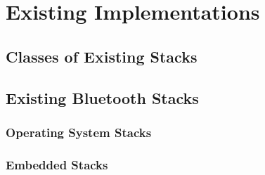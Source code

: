 \chapter{Existing Implementations}
\label{Chapter 2}


\section{Classes of Existing Stacks}


\section{Existing Bluetooth Stacks}


\subsection{Operating System Stacks}


\subsection{Embedded Stacks}


